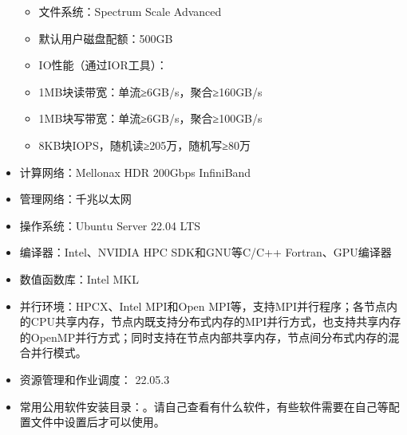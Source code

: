 \documentclass[a4paper,12pt,english]{sphinxmanual}
\begin{document}
\begin{itemize}
\begin{itemize}
\item {} 
\sphinxAtStartPar
文件系统：Spectrum Scale Advanced

\item {} 
\sphinxAtStartPar
默认用户磁盘配额：500GB

\item {} 
\sphinxAtStartPar
IO性能（通过IOR工具）：

\end{itemize}
\begin{itemize}
\item {} 
\sphinxAtStartPar
1MB块读带宽：单流≥6GB/s，聚合≥160GB/s

\item {} 
\sphinxAtStartPar
1MB块写带宽：单流≥6GB/s，聚合≥100GB/s

\item {} 
\sphinxAtStartPar
8KB块IOPS，随机读≥205万，随机写≥80万

\end{itemize}

\item {} 
\sphinxAtStartPar
计算网络：Mellonax HDR 200Gbps InfiniBand

\item {} 
\sphinxAtStartPar
管理网络：千兆以太网

\item {} 
\sphinxAtStartPar
操作系统：Ubuntu Server 22.04 LTS

\item {} 
\sphinxAtStartPar
编译器：Intel、NVIDIA HPC SDK和GNU等C/C++ Fortran、GPU编译器

\item {} 
\sphinxAtStartPar
数值函数库：Intel MKL

\item {} 
\sphinxAtStartPar
并行环境：HPC\sphinxhyphen{}X、Intel MPI和Open MPI等，支持MPI并行程序；各节点内的CPU共享内存，节点内既支持分布式内存的MPI并行方式，也支持共享内存的OpenMP并行方式；同时支持在节点内部共享内存，节点间分布式内存的混合并行模式。

\item {} 
\sphinxAtStartPar
资源管理和作业调度： 22.05.3

\item {} 
\sphinxAtStartPar
常用公用软件安装目录：。请自己查看有什么软件，有些软件需要在自己等配置文件中设置后才可以使用。

\end{itemize}
\end{document}
